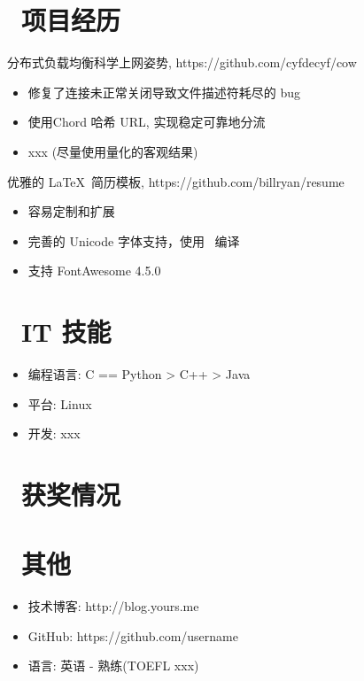 \documentclass{resume}
\begin{document}
\section{\faUsers\ 项目经历}

\begin{onehalfspacing}
  分布式负载均衡科学上网姿势, https://github.com/cyfdecyf/cow
  \begin{itemize}
    \item 修复了连接未正常关闭导致文件描述符耗尽的 bug
    \item 使用Chord 哈希 URL, 实现稳定可靠地分流
    \item xxx (尽量使用量化的客观结果)
  \end{itemize}
\end{onehalfspacing}

\begin{onehalfspacing}
  优雅的 \LaTeX\ 简历模板, https://github.com/billryan/resume
  \begin{itemize}
    \item 容易定制和扩展
    \item 完善的 Unicode 字体支持，使用 \XeLaTeX\ 编译
    \item 支持 FontAwesome 4.5.0
  \end{itemize}
\end{onehalfspacing}


\section{\faCogs\ IT 技能}
\begin{itemize}[parsep=0.5ex]
  \item 编程语言: C == Python > C++ > Java
  \item 平台: Linux
  \item 开发: xxx
\end{itemize}

\section{\faHeartO\ 获奖情况}

\section{\faInfo\ 其他}
\begin{itemize}[parsep=0.5ex]
  \item 技术博客: http://blog.yours.me
  \item GitHub: https://github.com/username
  \item 语言: 英语 - 熟练(TOEFL xxx)
\end{itemize}

%
%
\end{document}

